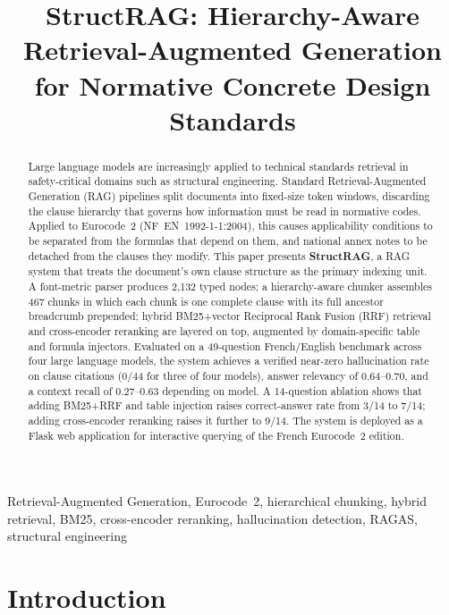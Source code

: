 \documentclass[conference]{IEEEtran}
\title{StructRAG: Hierarchy-Aware Retrieval-Augmented Generation
for Normative Concrete Design Standards}
\author{%
  \IEEEauthorblockN{Mohamed Khelil, Manef Belkadhi, Rached Hadj Amor}
  \IEEEauthorblockA{ESPRIT School of Engineering, Tunisia\\
    Supervisor: Afif Beji, Eng., M.Sc.\\
    \{khelil, belkadhi, hadjamor\}@esprit.tn}
}
\begin{document}
\maketitle

\begin{abstract}
Large language models are increasingly applied to technical standards
retrieval in safety-critical domains such as structural engineering.
Standard Retrieval-Augmented Generation (RAG) pipelines split documents
into fixed-size token windows, discarding the clause hierarchy that
governs how information must be read in normative codes.
Applied to Eurocode~2 (NF~EN~1992-1-1:2004), this causes
applicability conditions to be separated from the formulas that depend
on them, and national annex notes to be detached from the clauses they
modify.
This paper presents \textbf{StructRAG}, a RAG system that treats the
document's own clause structure as the primary indexing unit.
A font-metric parser produces 2{,}132 typed nodes; a hierarchy-aware
chunker assembles 467 chunks in which each chunk is one complete clause
with its full ancestor breadcrumb prepended; hybrid BM25+vector
Reciprocal Rank Fusion (RRF) retrieval and cross-encoder reranking
are layered on top, augmented by domain-specific table and formula
injectors.
Evaluated on a 49-question French/English benchmark across four large
language models, the system achieves a verified near-zero hallucination
rate on clause citations (0/44 for three of four models), answer
relevancy of 0.64--0.70, and a context recall of 0.27--0.63 depending
on model.
A 14-question ablation shows that adding BM25+RRF and table injection
raises correct-answer rate from 3/14 to 7/14; adding cross-encoder
reranking raises it further to 9/14.
The system is deployed as a Flask web application for interactive
querying of the French Eurocode~2 edition.
\end{abstract}

\begin{IEEEkeywords}
Retrieval-Augmented Generation, Eurocode~2, hierarchical chunking,
hybrid retrieval, BM25, cross-encoder reranking, hallucination
detection, RAGAS, structural engineering
\end{IEEEkeywords}

\section{Introduction}
\label{sec:intro}
\end{document}
